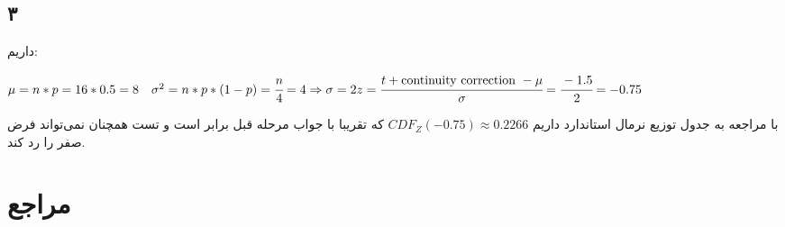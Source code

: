 \documentclass[12pt]{article}
\begin{document}
	\subsection{۳}
	داریم:
	\begin{latin}
		$
		\mu = n * p = 16 * 0.5 = 8
		\quad 
		\sigma^2 = n * p * (1 - p) = \cfrac{n}{4} = 4 \Rightarrow \sigma = 2
		z = \cfrac{t + \text{continuity correction } - \mu}{\sigma} = \cfrac{-1.5}{2} = -0.75
		$
	\end{latin}
	با مراجعه به جدول توزیع نرمال استاندارد داریم 
	$CDF_Z(-0.75) \approx 0.2266$
	که تقریبا با جواب مرحله قبل برابر است و تست همچنان نمی‌تواند فرض صفر را رد کند.
\section{مراجع}
\begin{latin}
	\printbibliography
\end{latin}

	
\end{document}
